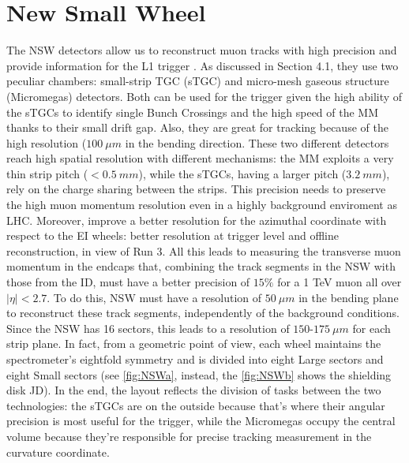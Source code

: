 \documentclass[11pt,a4paper,twoside,openright]{report}
\begin{document}
\section{New Small Wheel}
The NSW detectors allow us to reconstruct muon tracks with high precision and provide information for the L1 trigger \cite{ATLASdesc, NSW}. As discussed in Section 4.1, they use two peculiar chambers: small-strip TGC (sTGC) and micro-mesh gaseous structure (Micromegas) detectors. Both can be used for the trigger given the high ability of the sTGCs to identify single Bunch Crossings and the high speed of the MM thanks to their small drift gap. Also, they are great for tracking because of the high resolution (\(100\ \mu m\) in the bending direction. These two different detectors reach high spatial resolution with different mechanisms: the MM exploits a very thin strip pitch (\(<0.5\ mm\)), while the sTGCs, having a larger pitch (\(3.2\ mm\)), rely on the charge sharing between the strips. This precision needs to preserve the high muon momentum resolution even in a highly background enviroment as LHC. Moreover, improve a better resolution for the azimuthal coordinate with respect to the EI wheels: better resolution at trigger level and offline reconstruction, in view of Run 3. All this leads to measuring the transverse muon momentum in the endcaps that, combining the track segments in the NSW with those from the ID, must have a better precision of \(15\%\) for a 1 TeV muon all over \(|\eta|<2.7\). To do this, NSW must have a resolution of \(50\ \mu m\) in the bending plane to reconstruct these track segments, independently of the background conditions. Since the NSW has 16 sectors, this leads to a resolution of \(150\text{-}175\ \mu m\) for each strip plane. In fact, from a geometric point of view, each wheel maintains the spectrometer's eightfold symmetry and is divided into eight Large sectors and eight Small sectors (see \cref{fig:NSWa}, instead, the \cref{fig:NSWb} shows the shielding disk JD). In the end, the layout reflects the division of tasks between the two technologies: the sTGCs are on the outside because that's where their angular precision is most useful for the trigger, while the Micromegas occupy the central volume because they're responsible for precise tracking measurement in the curvature coordinate.
\end{document}
